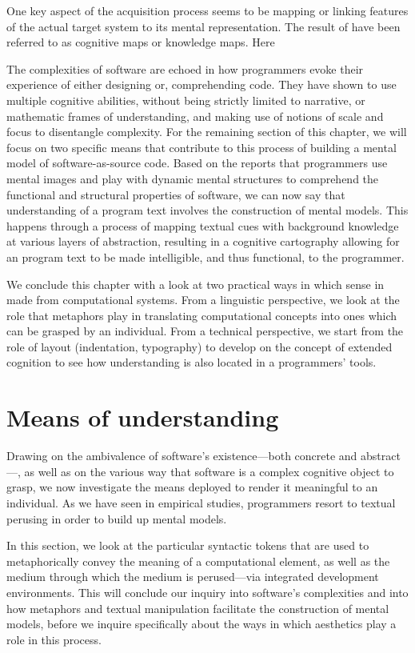 One key aspect  of the acquisition process seems to be mapping or linking features of the actual target system to its mental representation. The result of  have been referred to as cognitive maps or knowledge maps. Here

The complexities of software are echoed in how programmers evoke their experience of either designing or, comprehending code. They have shown to use multiple cognitive abilities, without being strictly limited to narrative, or mathematic frames of understanding, and making use of notions of scale and focus to disentangle complexity. For the remaining section of this chapter, we will focus on two specific means that contribute to this process of building a mental model of software-as-source code. Based on the reports that programmers use mental images and play with dynamic mental structures to comprehend the functional and structural properties of software, we can now say that understanding of a program text involves the construction of mental models. This happens through a process of mapping textual cues with background knowledge at various layers of abstraction, resulting in a cognitive cartography allowing for an program text to be made intelligible, and thus functional, to the programmer. 

We conclude this chapter with a look at two practical ways in which sense in made from computational systems. From a linguistic perspective, we look at the role that metaphors play in translating computational concepts into ones which can be grasped by an individual. From a technical perspective, we start from the role of layout (indentation, typography) to develop on the concept of extended cognition to see how understanding is also located in a programmers' tools.

\spacer

\section{Means of understanding}
\label{sec:means-understanding}

Drawing on the ambivalence of software's existence—both concrete and abstract—, as well as on the various way that software is a complex cognitive object to grasp, we now investigate the means deployed to render it meaningful to an individual. As we have seen in empirical studies, programmers resort to textual perusing in order to build up mental models.

In this section, we look at the particular syntactic tokens that are used to metaphorically convey the meaning of a computational element, as well as the medium through which the medium is perused—via integrated development environments. This will conclude our inquiry into software's complexities and into how metaphors and textual manipulation facilitate the construction of mental models, before we inquire specifically about the ways in which aesthetics play a role in this process.

